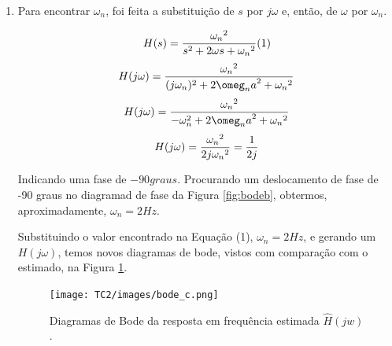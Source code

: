 \documentclass[12pt,letterpaper]{article}
\begin{document}
\begin{enumerate}[label=(\alph*)]
    \item
    Para encontrar $\omega_n$, foi feita a substituição de $s$ por $j\omega$ e, então, de $\omega$ por $\omega_n$.
    
    $$
    H(s) = {{\omega_n}^2 \over {s^2 + 2\omega s + {\omega_n}^2}     }  (1)
    $$
    $$
    H(j\omega) = {{\omega_n}^2 \over {(j\omega_n)^2 + 2{\omeg_na}^2  + {\omega_n}^2}     }
    $$
    $$
    H(j\omega) = {{\omega_n}^2 \over {-\omega_n^2 + 2{\omeg_na}^2  + {\omega_n}^2}     }
    $$
    $$
    H(j\omega) = {{\omega_n}^2 \over {2j{\omega_n}^2} } = {1 \over 2j}
    $$
    
    Indicando uma fase de $-90 graus$. Procurando um deslocamento de fase de -90 graus no diagramad de fase da Figura \ref{fig:bodeb}, obtermos, aproximadamente, $\omega_n = 2Hz$.
    
    Substituindo o valor encontrado na Equação (1), $\omega_n = 2Hz$, e gerando um $H(j \omega)$, temos novos diagramas de bode, vistos com comparação com o estimado, na Figura \ref{fig:bodec}.
    
            \begin{figure}[H]
            \centering
            \texttt{[image: TC2/images/bode\_c.png]}
            \caption{Diagramas de Bode da resposta em frequência estimada $\hat{H}(jw)$.}
            \label{fig:bodec}
        \end{figure}

    
\end{enumerate}





\end{document}
